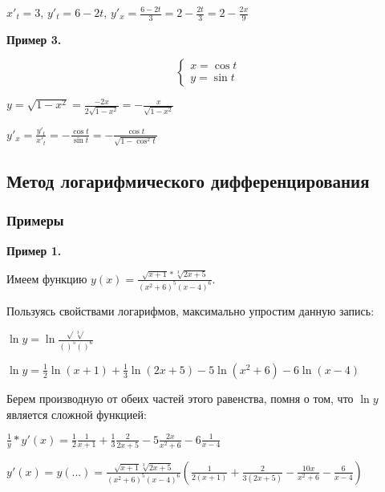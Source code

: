 \documentclass{article}
\begin{document}
\begin{flushleft}
\hfill

$x'_t = 3$, $y'_t = 6 - 2t$, $y'_x = \frac{6 - 2t}{3} = 2 - \frac{2t}{3} = 2 - \frac{2x}{9}$

\hfill

\textbf{Пример 3.}

\begin{equation}
    \begin{cases}
        x = \cos t \\
        y = \sin t
    \end{cases}
\end{equation}

$y = \sqrt{1 - x^2} = \frac{-2x}{2\sqrt{1 - x^2}} = -\frac{x}{\sqrt{1 - x^2}}$

$y'_x = \frac{y'_t}{x'_t} = -\frac{\cos t}{\sin t} = -\frac{\cos t}{\sqrt{1 - \cos^2 t}}$

\pagebreak
\subsection{Метод логарифмического дифференцирования}

\subsubsection{Примеры}

\textbf{Пример 1.}

Имеем функцию $y(x) = \frac{\sqrt{x + 1} * \sqrt[3]{2x + 5}}{(x^2 + 6)^5 (x - 4)^6}$.

Пользуясь свойствами логарифмов, максимально упростим данную запись:

\hfill

$\ln y = \ln \frac{\sqrt{} \sqrt[3]{}}{( )^5 ( )^6}$

$\ln y = \frac{1}{2} \ln (x + 1) + \frac{1}{3} \ln (2x + 5) - 5 \ln (x^2 + 6) - 6 \ln (x - 4)$

\hfill

Берем производную от обеих частей этого равенства, помня о том, что $\ln y$ является сложной функцией:

\hfill

$\frac{1}{y} * y'(x) = \frac{1}{2} \frac{1}{x + 1} + \frac{1}{3} \frac{2}{2x + 5} - 5 \frac{2x}{x^2 + 6} - 6 \frac{1}{x - 4}$

$y'(x) = y(...) = \frac{\sqrt{x + 1} \sqrt[3]{2x + 5}}{(x^2 + 6)^5 (x - 4)^6} (\frac{1}{2(x+1)} + \frac{2}{3(2x + 5)} - \frac{10x}{x^2 + 6} - \frac{6}{x - 4})$

\hfill


\end{flushleft}
\end{document}
